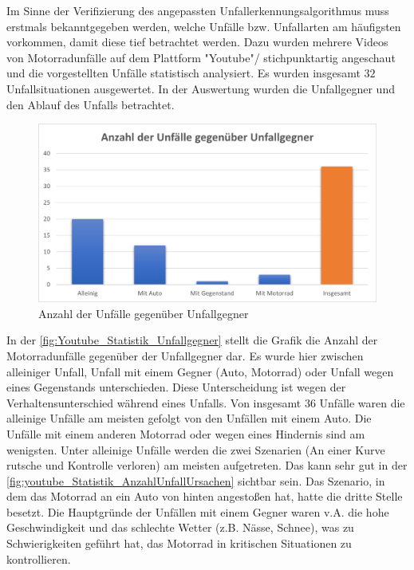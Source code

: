 Im Sinne der Verifizierung des angepassten Unfallerkennungsalgorithmus muss erstmals bekanntgegeben werden, welche Unfälle bzw. Unfallarten am häufigsten vorkommen, damit diese tief betrachtet werden. Dazu wurden mehrere Videos von Motorradunfälle auf dem Plattform "Youtube"/ stichpunktartig angeschaut und die vorgestellten Unfälle statistisch analysiert. Es wurden insgesamt $32$ Unfallsituationen ausgewertet. In der Auswertung wurden die Unfallgegner und den Ablauf des Unfalls betrachtet. \cite{YTMotoCrashComp} \cite{YTCrazyDriverVsBiker} \cite{YTMotoCrashedAndMishaps} \cite{YTAnimalsVsBikers} \cite{YTMotoCrashesRoad}
\begin{figure}[H]
	\centering
	\includegraphics[width=\linewidth]{Bilder/youtube_Statistik_Unfallgegner.png}
	\caption{Anzahl der Unfälle gegenüber Unfallgegner}
	\label{fig:Youtube_Statistik_Unfallgegner}
\end{figure}
In der \autoref{fig:Youtube_Statistik_Unfallgegner} stellt die Grafik die Anzahl der Motorradunfälle gegenüber der Unfallgegner dar. Es wurde hier zwischen alleiniger Unfall, Unfall mit einem Gegner (Auto, Motorrad) oder Unfall wegen eines Gegenstands unterschieden. Diese Unterscheidung ist wegen der Verhaltensunterschied während eines Unfalls. Von insgesamt 36 Unfälle waren die alleinige Unfälle am meisten gefolgt von den Unfällen mit einem Auto. Die Unfälle mit einem anderen Motorrad oder wegen eines Hindernis sind am wenigsten. 
Unter alleinige Unfälle werden die zwei Szenarien (An einer Kurve rutsche und Kontrolle verloren) am meisten aufgetreten. Das kann sehr gut in der \autoref{fig:youtube_Statistik_AnzahlUnfallUrsachen} sichtbar sein. Das Szenario, in dem das Motorrad an ein Auto von hinten angestoßen hat, hatte die dritte Stelle besetzt. Die Hauptgründe der Unfällen mit einem Gegner waren v.A. die hohe Geschwindigkeit und das schlechte Wetter (z.B. Nässe, Schnee), was zu Schwierigkeiten geführt hat, das Motorrad in kritischen Situationen zu kontrollieren.

